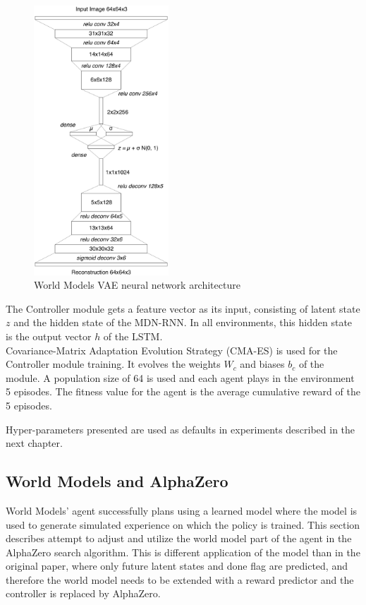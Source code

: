 \begin{figure}[H]
\includegraphics[width=0.45\textwidth,keepaspectratio]{figures/WorldModels/world_models_vae_architecture.png}
\caption{World Models VAE neural network architecture \cite{Algo.WorldModels}}
\label{Fig.WorldModelsVAEArchitecture}
\end{figure}

The Controller module gets a feature vector as its input, consisting of latent state $z$ and the hidden state of the MDN-RNN. In all environments, this hidden state is the output vector $h$ of the LSTM. \\
Covariance-Matrix Adaptation Evolution Strategy (CMA-ES) \cite{Algo.CMAES} is used for the Controller module training. It evolves the weights $W_c$ and biases $b_c$ of the module. A population size of 64 is used and each agent plays in the environment 5 episodes. The fitness value for the agent is the average cumulative reward of the 5 episodes.

Hyper-parameters presented are used as defaults in experiments described in the next chapter.

\subsection{World Models and AlphaZero}

World Models' agent \cite{Algo.WorldModels} successfully plans using a learned model where the model is used to generate simulated experience on which the policy is trained. This section describes attempt to adjust and utilize the world model part of the agent in the AlphaZero search algorithm. This is different application of the model than in the original paper, where only future latent states and done flag are predicted, and therefore the world model needs to be extended with a reward predictor and the controller is replaced by AlphaZero.

